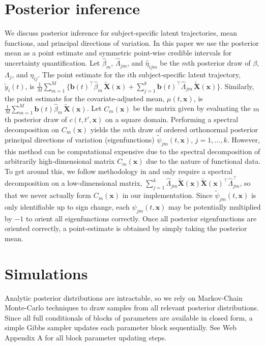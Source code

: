 \documentclass[useAMS,referee,usenatbib]{biom}
\begin{document}
\section{Posterior inference}
\label{s:posteriors}
We discuss posterior inference for subject-specific latent trajectories, mean functions, and principal directions of variation. In this paper we use the posterior mean as a point estimate and symmetric point-wise credible intervals for uncertainty quantification. Let $\hat{\beta}_{m}$, $\hat{\Lambda}_{jm}$, and $\hat{\eta}_{ijm}$ be the $m$th posterior draw of $\beta$, $\Lambda_{j}$, and $\eta_{ij}$. The point estimate for the $i$th subject-specific latent trajectory, $\tilde{y}_{i}(t)$, is $\frac{1}{M}\sum_{m=1}^{M}\{\mathbf{b}(t)^{\top}\hat{\beta}_{m}\,\mathbf{\tilde{X}}(\mathbf{x}) + \sum_{j=1}^{k}\mathbf{b}(t)^{\top}\hat{\Lambda}_{jm}\,\mathbf{\tilde{X}}(\mathbf{x})\}$. Similarly, the point estimate for the covariate-adjusted mean, $\mu(t, \mathbf{x})$, is $\frac{1}{M}\sum_{m=1}^{M}\mathbf{b}(t)\hat{\beta}_{m}\,\mathbf{\tilde{X}}(\mathbf{x})$. Let $C_{m}(\mathbf{x})$ be the matrix given by evaluating the $m$th posterior draw of $c(t,t', \mathbf{x})$ on a square domain. Performing a spectral decomposition on $C_{m}(\mathbf{x})$ yields the $m$th draw of ordered orthonormal posterior principal directions of variation (eigenfunctions) $\tilde{\psi}_{jm}(t, \mathbf{x})$, $j = 1,\ldots, k$. However, this method can be computational expensive due to the spectral decomposition of arbitrarily high-dimensional matrix $C_{m}(\mathbf{x})$ due to the nature of functional data. To get around this, we follow methodology in \cite{Aguilera2013} and only require a spectral decomposition on a low-dimensional matrix, $\sum_{j=1}^{k}\hat{\Lambda}_{jm}\tilde{\mathbf{X}}(\mathbf{x})\tilde{\mathbf{X}}(\mathbf{x})^{\top}\hat{\Lambda}_{jm}^{\top}$, so that we never actually form $C_{m}(\mathbf{x})$ in our implementation. Since $\tilde{\psi}_{jm}(t, \mathbf{x})$ is only identifiable up to sign change, each $\psi_{jm}(t, \mathbf{x})$ may be potentially multiplied by $-1$ to orient all eigenfunctions correctly. Once all posterior eigenfunctions are oriented correctly, a point-estimate is obtained by simply taking the posterior mean. 




\section{Simulations}
\label{s:simulation}
\iffalse Analytic posterior distributions are intractable, so we rely on Markov-Chain Monte-Carlo techniques to draw samples from all relevant posterior distributions. Since all full conditionals of blocks of parameters are available in closed form, a simple Gibbs sampler updates each parameter block sequentially. See Web Appendix A for all block parameter updating steps.
\end{document}
